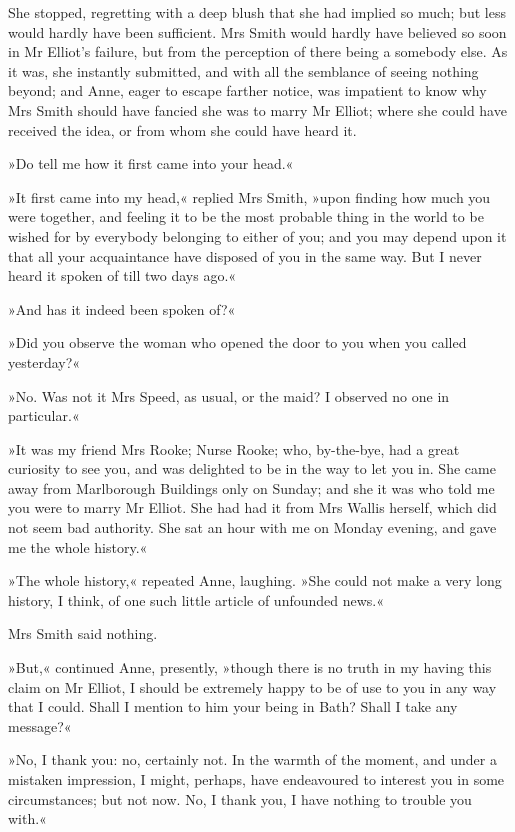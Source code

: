 She stopped, regretting with a deep blush that she had implied so much; but less would hardly have been sufficient. Mrs Smith would hardly have believed so soon in Mr Elliot's failure, but from the perception of there being a somebody else. As it was, she instantly submitted, and with all the semblance of seeing nothing beyond; and Anne, eager to escape farther notice, was impatient to know why Mrs Smith should have fancied she was to marry Mr Elliot; where she could have received the idea, or from whom she could have heard it.

»Do tell me how it first came into your head.«

»It first came into my head,« replied Mrs Smith, »upon finding how much you were together, and feeling it to be the most probable thing in the world to be wished for by everybody belonging to either of you; and you may depend upon it that all your acquaintance have disposed of you in the same way. But I never heard it spoken of till two days ago.«

»And has it indeed been spoken of?«

»Did you observe the woman who opened the door to you when you called yesterday?«

»No. Was not it Mrs Speed, as usual, or the maid? I observed no one in particular.«

»It was my friend Mrs Rooke; Nurse Rooke; who, by-the-bye, had a great curiosity to see you, and was delighted to be in the way to let you in. She came away from Marlborough Buildings only on Sunday; and she it was who told me you were to marry Mr Elliot. She had had it from Mrs Wallis herself, which did not seem bad authority. She sat an hour with me on Monday evening, and gave me the whole history.«

»The whole history,« repeated Anne, laughing. »She could not make a very long history, I think, of one such little article of unfounded news.«

Mrs Smith said nothing.

»But,« continued Anne, presently, »though there is no truth in my having this claim on Mr Elliot, I should be extremely happy to be of use to you in any way that I could. Shall I mention to him your being in Bath? Shall I take any message?«

»No, I thank you: no, certainly not. In the warmth of the moment, and under a mistaken impression, I might, perhaps, have endeavoured to interest you in some circumstances; but not now. No, I thank you, I have nothing to trouble you with.«

